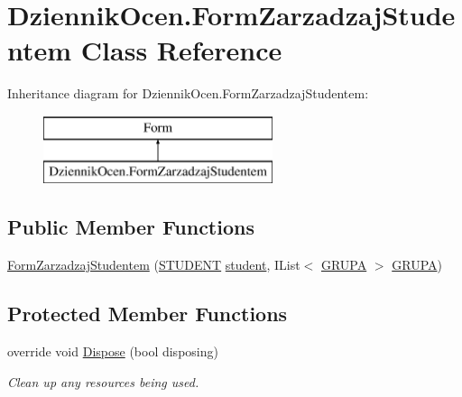 \hypertarget{class_dziennik_ocen_1_1_form_zarzadzaj_studentem}{}\section{Dziennik\+Ocen.\+Form\+Zarzadzaj\+Studentem Class Reference}
\label{class_dziennik_ocen_1_1_form_zarzadzaj_studentem}
Inheritance diagram for Dziennik\+Ocen.\+Form\+Zarzadzaj\+Studentem\+:\begin{figure}[H]
\begin{center}
\leavevmode
\includegraphics[height=2.000000cm]{class_dziennik_ocen_1_1_form_zarzadzaj_studentem}
\end{center}
\end{figure}
\subsection*{Public Member Functions}
\begin{DoxyCompactItemize}
\item 
\hyperlink{class_dziennik_ocen_1_1_form_zarzadzaj_studentem_a2437cda216a51a08ae749edb555e8b28}{Form\+Zarzadzaj\+Studentem} (\hyperlink{class_dziennik_ocen_1_1_s_t_u_d_e_n_t}{S\+T\+U\+D\+E\+NT} \hyperlink{class_dziennik_ocen_1_1_form_zarzadzaj_studentem_af05f1e588d74d7907c8259468f916dad}{student}, I\+List$<$ \hyperlink{class_dziennik_ocen_1_1_g_r_u_p_a}{G\+R\+U\+PA} $>$ \hyperlink{class_dziennik_ocen_1_1_g_r_u_p_a}{G\+R\+U\+PA})
\end{DoxyCompactItemize}
\subsection*{Protected Member Functions}
\begin{DoxyCompactItemize}
\item 
override void \hyperlink{class_dziennik_ocen_1_1_form_zarzadzaj_studentem_a90df6d8bdf00f5ce184053c526952368}{Dispose} (bool disposing)
\begin{DoxyCompactList}\small\item\em Clean up any resources being used. \end{DoxyCompactList}\end{DoxyCompactItemize}
